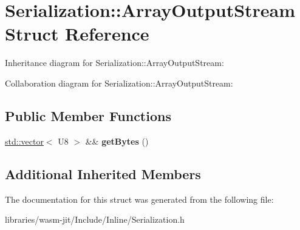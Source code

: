 \hypertarget{struct_serialization_1_1_array_output_stream}{}\section{Serialization\+:\+:Array\+Output\+Stream Struct Reference}
\label{struct_serialization_1_1_array_output_stream}


Inheritance diagram for Serialization\+:\+:Array\+Output\+Stream\+:


Collaboration diagram for Serialization\+:\+:Array\+Output\+Stream\+:
\subsection*{Public Member Functions}
\begin{DoxyCompactItemize}
\item 
\mbox{\label{struct_serialization_1_1_array_output_stream_a0c59e108d1423ad1fea5066d62b4384b}} 
\mbox{\hyperlink{classstd_1_1vector}{std\+::vector}}$<$ U8 $>$ \&\& {\bfseries get\+Bytes} ()
\end{DoxyCompactItemize}
\subsection*{Additional Inherited Members}


The documentation for this struct was generated from the following file\+:\begin{DoxyCompactItemize}
\item 
libraries/wasm-\/jit/\+Include/\+Inline/Serialization.\+h\end{DoxyCompactItemize}
